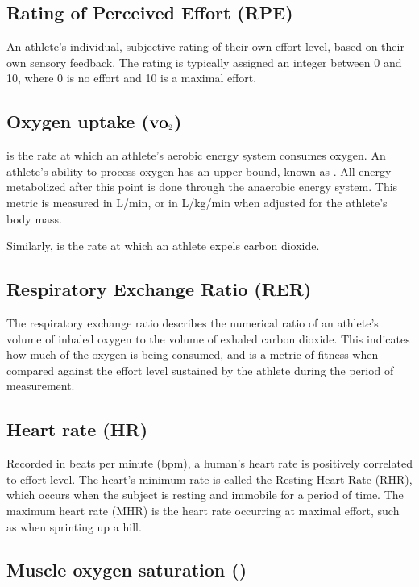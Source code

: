 \subsection{Rating of Perceived Effort (RPE)}\cn
    An athlete's individual, subjective rating of their own effort level, based on their own sensory feedback. The rating is typically assigned an integer between 0 and 10, where 0 is no effort and 10 is a maximal effort.
\subsection{Oxygen uptake ($\mathbf{VO_\textsc{2}}$)}\cn
\vot{} is the rate at which an athlete's aerobic energy system consumes oxygen. An athlete's ability to process oxygen has an upper bound, known as \votmax{}. All energy metabolized after this point is done through the anaerobic energy system\cn. This metric is measured in \si{L/min}, or in \si{L/kg/min} when adjusted for the athlete's body mass. 

Similarly, \vcot{} is the rate at which an athlete expels carbon dioxide.
\subsection{Respiratory Exchange Ratio (RER)}\cn
    The respiratory exchange ratio describes the numerical ratio of an athlete's volume of inhaled oxygen to the volume of exhaled carbon dioxide. This indicates how much of the oxygen is being consumed, and is a metric of fitness when compared against the effort level sustained by the athlete during the period of measurement.
\subsection{Heart rate (HR)}\cn
    Recorded in beats per minute (bpm), a human's heart rate is positively correlated to effort level. The heart's minimum rate is called the Resting Heart Rate (RHR), which occurs when the subject is resting and immobile for a period of time. The maximum heart rate (MHR) is the heart rate occurring at maximal effort, such as when sprinting up a hill.
\subsection{Muscle oxygen saturation (\smo)}\cn

